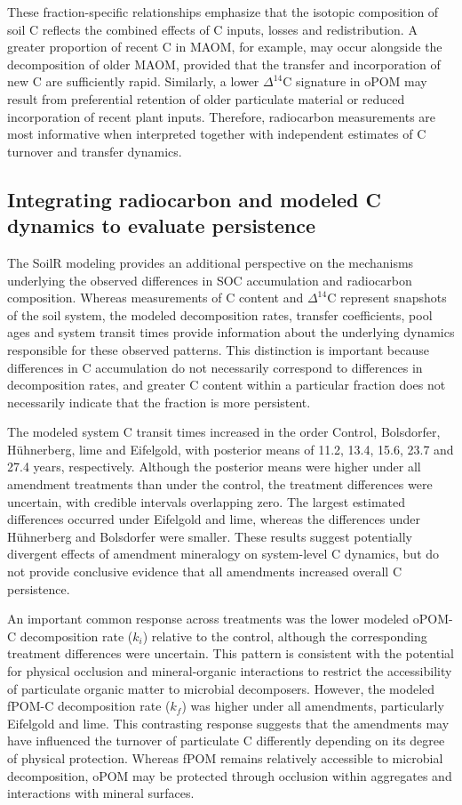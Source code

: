 \documentclass[preprint,12pt]{elsarticle}
\begin{document}
These fraction-specific relationships emphasize that the isotopic composition of soil C reflects the combined effects of C inputs, losses and redistribution. A greater proportion of recent C in MAOM, for example, may occur alongside the decomposition of older MAOM, provided that the transfer and incorporation of new C are sufficiently rapid. Similarly, a lower $\Delta^{14}$C signature in oPOM may result from preferential retention of older particulate material or reduced incorporation of recent plant inputs. Therefore, radiocarbon measurements are most informative when interpreted together with independent estimates of C turnover and transfer dynamics.

\subsection{Integrating radiocarbon and modeled C dynamics to evaluate persistence}
\label{subsec:modeled_persistence}

The SoilR modeling provides an additional perspective on the mechanisms underlying the observed differences in SOC accumulation and radiocarbon composition. Whereas measurements of C content and $\Delta^{14}$C represent snapshots of the soil system, the modeled decomposition rates, transfer coefficients, pool ages and system transit times provide information about the underlying dynamics responsible for these observed patterns. This distinction is important because differences in C accumulation do not necessarily correspond to differences in decomposition rates, and greater C content within a particular fraction does not necessarily indicate that the fraction is more persistent.

The modeled system C transit times increased in the order Control, Bolsdorfer, Hühnerberg, lime and Eifelgold, with posterior means of 11.2, 13.4, 15.6, 23.7 and 27.4 years, respectively. Although the posterior means were higher under all amendment treatments than under the control, the treatment differences were uncertain, with credible intervals overlapping zero. The largest estimated differences occurred under Eifelgold and lime, whereas the differences under Hühnerberg and Bolsdorfer were smaller. These results suggest potentially divergent effects of amendment mineralogy on system-level C dynamics, but do not provide conclusive evidence that all amendments increased overall C persistence.

An important common response across treatments was the lower modeled oPOM-C decomposition rate ($k_i$) relative to the control, although the corresponding treatment differences were uncertain. This pattern is consistent with the potential for physical occlusion and mineral-organic interactions to restrict the accessibility of particulate organic matter to microbial decomposers. However, the modeled fPOM-C decomposition rate ($k_f$) was higher under all amendments, particularly Eifelgold and lime. This contrasting response suggests that the amendments may have influenced the turnover of particulate C differently depending on its degree of physical protection. Whereas fPOM remains relatively accessible to microbial decomposition, oPOM may be protected through occlusion within aggregates and interactions with mineral surfaces.
\end{document}
